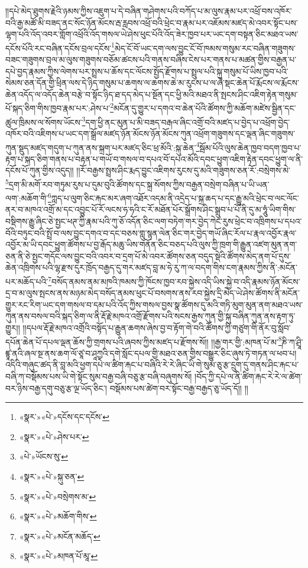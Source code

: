 །།དཔེ་མེད་ཐུགས་རྗེའི་ཉམས་ཀྱིས་འཇུག་པ་དེ་བཞིན་གཤེགས་པའི་བཀོད་པ་མ་ལུས་རྣམ་པར་འཕྲོ་བས་འཁོར་བའི་རྒྱ་མཚོ་མི་བཟད་ནང་སོང་ཉོན་མོངས་རྦ་རླབས་འཕྲོ་བའི་ཕྲེང་བ་རྣམ་པར་འཇོམས་མཛད་མེ་འབར་སྟོང་པས་ལྷག་པའི་འོད་འབར་གློག་འཕྲོའི་འོད་གསལ་ཡེ་ཤེས་ཕུང་པོའི་འོད་ཟེར་ཁྱབ་པར་ཡང་དག་བསྟན་ཅིང་མཐའ་ཡས་དངོས་པོའི་རང་བཞིན་དངོས་བྲལ་དངོས་\footnote{«སྣར་»«པེ་»དངོས་དང་དངོས་}མེད་ངོ་བོ་ཡང་དག་ལས་བྱུང་ངོ་བོ་ཁམས་གསུམ་རང་བཞིན་གཟུགས་བཟང་གཟུགས་བྲལ་མ་ལུས་གཟུགས་བཅོམ་ཚངས་པའི་གནས་བཞིས་ངེས་པར་གནས་པ་མཚན་གྱིས་བརྒྱན་པ་དཔེ་བྱད་རྣམས་ཀྱིས་ལེགས་པར་སྤྲས་པ་ཆོས་དང་ལོངས་སྤྱོད་རྫོགས་པ་སྤྲུལ་པའི་སྐུ་གསུམ་པོ་ཡིས་ཁྱབ་པའི་སེམས་ཅན་དོན་གྱི་ཕྲིན་ལས་དེ་ཉིད་གསུམ་པ་ཆགས་ལ་ཆགས་ཆེ་མ་རུངས་པ་ལ་ཞེ་སྡང་ཆེན་པོ་རྨོངས་ལ་རྨོངས་ཆེན་འདོད་ལ་འདོད་ཆེན་བརྩེ་བ་སྟོང་ཉིད་ཐ་དད་མེད་པ་སྔོན་དང་ཕྱི་མའི་མཐའ་ནི་སྤངས་ཤིང་འཇིག་རྟེན་གསུམ་པོ་སྐད་ཅིག་གིས་ཁྱབ་རྣམ་པར་:ཤེས་པ་\footnote{«སྣར་»«པེ་»ཤེས་པར་}མངོན་དུ་གྱུར་པ་དགའ་བ་ཆེན་པོའི་ཚོགས་ཀྱི་མཆོག་མཛེས་སྦྱིན་དང་ཚུལ་ཁྲིམས་ལ་སོགས་ཡོངས་\footnote{«པེ་»ཡོངས་སུ་}དག་ཕྱི་ནང་མུན་པ་མི་བཟད་བརྒལ་ཞིང་འགྲོ་བའི་མཛད་པ་བྱེད་པ་འཕྲོག་བྱེད་འཁོར་བའི་འཇིགས་པ་ཡང་དག་སྒྲོལ་མཛད་ཉོན་མོངས་ཉོན་མོངས་ཀུན་འཕྲོག་གཟུགས་དང་ལྡན་ཞིང་གཟུགས་ཀུན་སྡུད་མཛད་གདུག་པ་ཀུན་ནས་སྐྲག་པར་མཛད་ཅིང་ཕྲ་མོའི་:སྐུ་ཆེན་\footnote{«སྣར་»«པེ་»སྐུ་ཅན་}སྦོམ་པོའི་ལུས་ཆེན་ཁྱབ་བདག་ཁྱབ་པ་རྟག་པ་སྐད་ཅིག་གནས་པ་བརྟན་པ་གཡོ་བ་གསལ་བ་དཔའ་བོ་དཔའ་མོའི་དབང་ཕྱུག་འཇིག་རྟེན་དབང་ཕྱུག་ལ་ནི་དངོས་པོ་ཀུན་གྱིས་འདུད།། །།རོ་བརྒྱས་སྤྲས་ཤིང་རྨད་བྱུང་འཇིགས་རུངས་དུ་མའི་གཟུགས་ཅན་རོ་:བསྲེགས་མེ་\footnote{«སྣར་»«པེ་»བསྲེགས་མ་}དྲག་མི་མགོ་རབ་གཏུམ་རུས་པ་དུམ་བུའི་ཚོགས་དང་སྐྲ་སོགས་ཀྱིས་བརྒྱན་བསྲེག་བཞིན་པ་ཡི་ཡན་ལག་:མཆོག་གི་\footnote{«སྣར་»«པེ་»མཆོག་གིས་}ཀླད་པ་ལུག་ཅིང་རྐང་མར་ཞག་འཐོར་འདམ་ནི་འདྲེད་པ་སྐྲ་ཆད་པ་དང་རྒྱུ་མའི་ཕྲེང་བ་ལང་ལོང་ནར་བ་མཁའ་འགྲོ་མ་དང་འབྱུང་པོ་རོ་ལངས་ཧ་ཧའི་ང་རོ་མཐོན་པོར་སྒྲོགས་ཤིང་སྒྲུབ་པ་པོ་ནི་དུ་མ་ཧཱུཾ་ཡིག་གིས་བསྡིགས་རྒྱུ་ཞིང་ཅེ་སྤྱང་ཕཊ་ཀྱི་རྣམ་པའི་ཀུ་ཅོ་འདོན་ཅིང་ལག་བཏེག་གར་བྱེད་ཀེང་རུས་ཕྲེང་བ་འཁྲིགས་པ་དཔའ་བོའི་བཏུང་བའི་སྤྲོ་བ་ལས་བྱུང་དགའ་བ་དང་བཅས་གླུ་སྙན་ལེན་ཅིང་གར་བྱེད་གཡོ་ཞིང་རོལ་པ་རྣལ་འབྱོར་རྣལ་འབྱོར་མ་ཡི་དབང་ཕྱུག་ཚོགས་པ་བྱ་རྒོད་མཆུ་ཡིས་གནོན་ཅིང་བཅད་པའི་ལུས་ཀྱི་ཁྲག་གི་རྒྱུན་འཛག་མུན་ནག་ཅན་ནི་ཅེ་སྤྱང་གདོང་ལས་བྱུང་བའི་འབར་བ་དྲག་པོ་མེ་འབར་ཚོགས་ཅན་བདུད་སྡེའི་ཚོགས་མེད་ནག་པོ་དུས་ཆེན་འཁྲིགས་པའི་ལྷ་རྫས་དུར་ཁྲོད་བརྒྱད་དུ་གར་མཛད་བླ་མ་ཧེ་རུ་ཀ་ལ་བདག་གིས་ངག་རྣམས་ཀྱིས་ནི་:མངོན་པར་མཆོད་པའི་\footnote{«སྣར་»«པེ་»མངོན་མཆོད་}བསོད་ནམས་ནམ་མཁའི་ཁམས་ཀྱི་ཁོངས་ཁྱབ་རབ་སྐྱེས་འདི་ཡིས་སྐྱེ་བ་འདི་རྣམས་ཉོན་མོངས་དྲ་བ་མ་ལུས་སྤངས་ནས་མཉམ་མེད་བསོད་ནམས་ཕུང་པོ་བསགས་ནས་རབ་སྐྱེས་དྲི་མེད་ཡེ་ཤེས་ཚོགས་ནི་མངོན་གྱུར་རང་རིག་ཡང་དག་གསལ་བ་དམ་པའི་འོད་ཀྱིས་གསལ་བྱས་སྣ་ཚོགས་དུ་མའི་གཏི་མུག་མུན་ནག་མཐའ་ཡས་ཀུན་ནས་བསལ་བའི་སྐད་ཅིག་ལ་ནི་རྡོ་རྗེ་མཁའ་འགྲོ་རྫོགས་པའི་སངས་རྒྱས་ཀུན་གྱི་སྐུ་བཞིན་ཀུན་ནས་རྟག་ཏུ་གྱུར།། །།དཔལ་རྡོ་རྗེ་མཁའ་འགྲོའི་བསྟོད་པ་རྒྱུན་ཆགས་ཞེས་བྱ་བ་རྟོག་གེ་བའི་ཚོགས་ཀྱི་གཙུག་གི་ནོར་བུ་སློབ་དཔོན་ཆེན་པོ་དཔལ་ལྡན་ཆོས་ཀྱི་གྲགས་པའི་ཞབས་ཀྱིས་མཛད་པ་རྫོགས་སོ།། །།རྒྱ་གར་གྱི་:མཁན་པོ་མ་\footnote{«སྣར་»«པེ་»མཁན་པོ་མཱ་}ཎི་ཀ་ཤྲཱི་ཛྙཱ་ནའི་ཞལ་སྔ་ནས་ཆག་ལོ་ཙཱ་བ་ཤཱཀྱའི་དགེ་སློང་དཔལ་གྱི་མཐའ་ཅན་གྱིས་བསྒྱུར་ཅིང་ཞུས་ཏེ་གཏན་ལ་ཕབ་པ། འདིའི་གཞུང་ཚད་ནི་བླ་མའི་ཕྱག་དཔེ་ལ་ཚིག་རྐང་པ་བཞིའི་རེ་རེ་ཞིང་ཡི་གེ་སུམ་ཅུ་རྩ་དྲུག་དུ་གནས་ཤིང་རྐང་པ་བཞི་ཀ་བསྡོམས་པས་ཡི་གེ་སྟོང་སུམ་བརྒྱ་བཞི་བཅུ་རྩ་བཞི་བཞུགས་སོ། །བོད་ཀྱི་དཔེ་ལ་ནི་ཚིག་རྐང་རེ་རེ་ལ་ཚེག་བར་ཉིས་བརྒྱ་དགུ་བཅུ་རྩ་ལྔ་ཡོད་ཅིང་། བསྡོམས་པས་ཚེག་བར་སྟོང་བརྒྱ་བརྒྱད་ཅུ་ཡོད་དོ།། །།